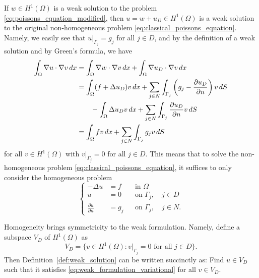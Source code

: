 \documentclass[english, 12pt, a4paper, sci, utf8, a-2b, online]{aaltothesis}
\theoremstyle{definition}
\theoremstyle{plain}
\newcommand*\diff{\mathop{}\!d}
\numberwithin{equation}{section}
\begin{document}
If $w \in H^1(\Omega)$ is a weak solution to the problem
\eqref{eq:poissons_equation_modified}, then $u = w + u_D \in H^1(\Omega)$
is a weak solution to the original non-homogeneous problem
\eqref{eq:classical_poissons_equation}. Namely, we easily see that
$u|_{\Gamma_j} = g_j$ for all $j \in D$, and by the definition of
a weak solution and by Green's formula, we have
\begin{align*}
    \int_{\Omega} \nabla u \cdot \nabla v \diff x
    &= \int_{\Omega} \nabla w \cdot \nabla v \diff x
        + \int_{\Omega} \nabla u_D \cdot \nabla v \diff x \\
    &= \int_{\Omega} (f + \Delta u_D) v \diff x
        + \sum_{j \in N} \int_{\Gamma_j}
            \left( g_j - \frac{\partial u_D}{\partial n} \right) v \diff S \\
    &\hspace{7mm} - \int_{\Omega} \Delta u_D v \diff x
                    + \sum_{j \in N} \int_{\Gamma_j}
                        \frac{\partial u_D}{\partial n} v \diff S \\
    &= \int_{\Omega} fv \diff x + \sum_{j \in N} \int_{\Gamma_j} g_j v \diff S
\end{align*}
for all $v \in H^1(\Omega)$ with $v|_{\Gamma_j} = 0$ for all $j \in D$.
This means that to solve the non-homogeneous problem 
\eqref{eq:classical_poissons_equation}, it suffices to only consider the 
homogeneous problem
\begin{equation}
    \label{eq:poissons_equation_homogeneous}
    \left\{
        \begin{aligned}
            -\Delta u &= f && \text{in } \Omega \\
            u &= 0 && \text{on } \Gamma_j, \quad j \in D \\
            \frac{\partial u}{\partial n} &= g_j && \text{on } \Gamma_j,
            \quad j \in N.
        \end{aligned}
    \right.
\end{equation}

Homogeneity brings symmetricity to the weak formulation.
Namely, define a subspace $V_D$ of $H^1(\Omega)$ as
\begin{equation*}
    V_D = \{ v \in H^1(\Omega) :
        v|_{\Gamma_j} = 0 \text{ for all } j \in D \}.
\end{equation*}
Then Definition~\ref{def:weak_solution}
can be written succinctly as: Find $u \in V_D$ such that it satisfies
\eqref{eq:weak_formulation_variational} for all $v \in V_D$.
\end{document}
